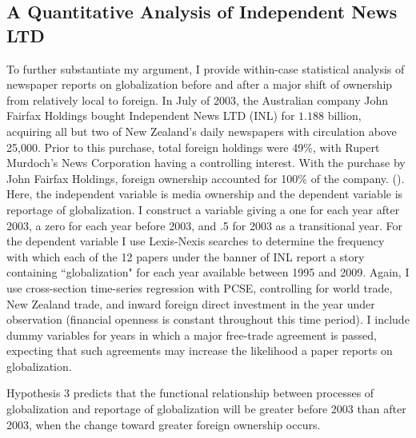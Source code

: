 \documentclass[12pt]{report}
\begin{document}
\subsection{A Quantitative Analysis of Independent News LTD}
To further substantiate my argument, I provide within-case statistical analysis of newspaper reports on globalization before and after a major shift of ownership from relatively local to foreign. In July of 2003, the
Australian company John Fairfax Holdings bought Independent News LTD (INL) for $1.188$ billion,
acquiring all but two of New Zealand's daily newspapers with circulation above 25,000. Prior to this
purchase, total foreign holdings were 49\%, with Rupert Murdoch's News Corporation having a
controlling interest. With the purchase by John Fairfax Holdings, foreign ownership accounted for
100\% of the company. (\citealt{Rosenberg:2008wu}).     Here, the independent variable is media ownership and
the dependent variable is reportage of globalization. I construct a variable giving a one for each
year after 2003, a zero for each year before 2003, and .5 for 2003 as a transitional year. For the
dependent variable I use Lexis-Nexis searches to determine the frequency with which each of the 12
papers under the banner of INL report a story containing ``globalization" for each year available
between 1995 and 2009. Again, I use cross-section time-series regression with PCSE, controlling for
world trade, New Zealand trade, and inward foreign direct investment in the year under observation
(financial openness is constant throughout this time period). I include dummy variables for years in
which a major free-trade agreement is passed, expecting that such agreements may increase the
likelihood a paper reports on globalization.

Hypothesis 3 predicts that the functional relationship between processes of globalization and
reportage of globalization will be greater before 2003 than after 2003, when the change toward
greater foreign ownership occurs.
\end{document}
